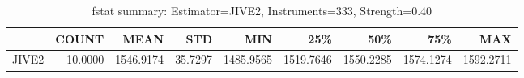 \begin{table}[ht]
\centering
\caption{fstat summary: Estimator=JIVE2, Instruments=333, Strength=0.40}
\begin{tabular}{lrrrrrrrr}
\toprule
 & COUNT & MEAN & STD & MIN & 25\% & 50\% & 75\% & MAX \\
\midrule
JIVE2 & 10.0000 & 1546.9174 & 35.7297 & 1485.9565 & 1519.7646 & 1550.2285 & 1574.1274 & 1592.2711 \\
\bottomrule
\end{tabular}
\end{table}
